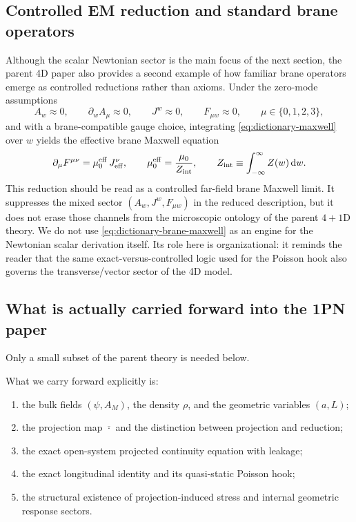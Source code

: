 \documentclass[11pt]{article}
\newcommand{\dd}{\mathrm d}
\newcommand{\Zloc}{Z}
\newcommand{\Proj}[1]{\overline{#1}}
\begin{document}
\subsection{Controlled EM reduction and standard brane operators}
\label{sec:dictionary-em}

Although the scalar Newtonian sector is the main focus of the next section, the parent 4D
paper also provides a second example of how familiar brane operators emerge as controlled
reductions rather than axioms. Under the zero-mode assumptions
\begin{equation}
A_w \approx 0,
\qquad
\partial_w A_\mu \approx 0,
\qquad
J^w \approx 0,
\qquad
F_{\mu w}\approx 0,
\qquad
\mu\in\{0,1,2,3\},
\label{eq:dictionary-zero-mode}
\end{equation}
and with a brane-compatible gauge choice, integrating
\eqref{eq:dictionary-maxwell} over \(w\) yields the effective brane Maxwell equation
\begin{equation}
\partial_\mu F^{\mu\nu}
=
\mu_0^{\rm eff}\,J_{\rm eff}^\nu,
\qquad
\mu_0^{\rm eff}
=
\frac{\mu_0}{Z_{\rm int}},
\qquad
Z_{\rm int}\equiv \int_{-\infty}^{\infty}\Zloc(w)\,\dd w.
\label{eq:dictionary-brane-maxwell}
\end{equation}
This reduction should be read as a controlled far-field brane Maxwell limit. It suppresses
the mixed sector \((A_w,J^w,F_{\mu w})\) in the reduced description, but it does not erase
those channels from the microscopic ontology of the parent \(4{+}1\)D theory.
We do not use \eqref{eq:dictionary-brane-maxwell} as an engine for the Newtonian scalar
derivation itself. Its role here is organizational: it reminds the reader that the same
exact-versus-controlled logic used for the Poisson hook also governs the transverse/vector
sector of the 4D model.

\subsection{What is actually carried forward into the 1PN paper}
\label{sec:dictionary-note}

Only a small subset of the parent theory is needed below.

What we carry forward explicitly is:
\begin{enumerate}[leftmargin=1.5em]
  \item the bulk fields \((\psi,A_M)\), the density \(\rho\), and the geometric variables \((a,L)\);
  \item the projection map \(\Proj{\cdot}\) and the distinction between projection and reduction;
  \item the exact open-system projected continuity equation with leakage;
  \item the exact longitudinal identity and its quasi-static Poisson hook;
  \item the structural existence of projection-induced stress and internal geometric response sectors.
\end{enumerate}
\end{document}
